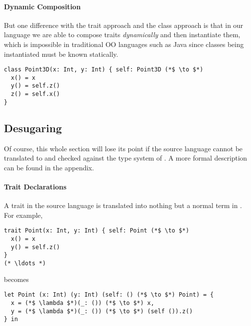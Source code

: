 \paragraph{Dynamic Composition}
But one difference with the trait approach and the class approach is
that in our language we are able to compose traits \emph{dynamically} and then
instantiate them, which is impossible in traditional OO languages such as Java
since classes being instantiated must be known statically.



\begin{lstlisting}
class Point3D(x: Int, y: Int) { self: Point3D (*$ \to $*)
  x() = x
  y() = self.z()
  z() = self.x()
}
\end{lstlisting}

\subsection{Desugaring}

Of course, this whole section will lose its point if the source language cannot
be translated to \name and checked against the type system of \name. A more
formal description can be found in the appendix.

\paragraph{Trait Declarations} A trait in the source language is translated into
nothing but a normal term in \name. For example,

\begin{lstlisting}
trait Point(x: Int, y: Int) { self: Point (*$ \to $*)
  x() = x
  y() = self.z()
}
(* \ldots *)
\end{lstlisting}

becomes

\begin{lstlisting}
let Point (x: Int) (y: Int) (self: () (*$ \to $*) Point) = {
  x = (*$ \lambda $*)(_: ()) (*$ \to $*) x,
  y = (*$ \lambda $*)(_: ()) (*$ \to $*) (self ()).z()
} in
\end{lstlisting}

